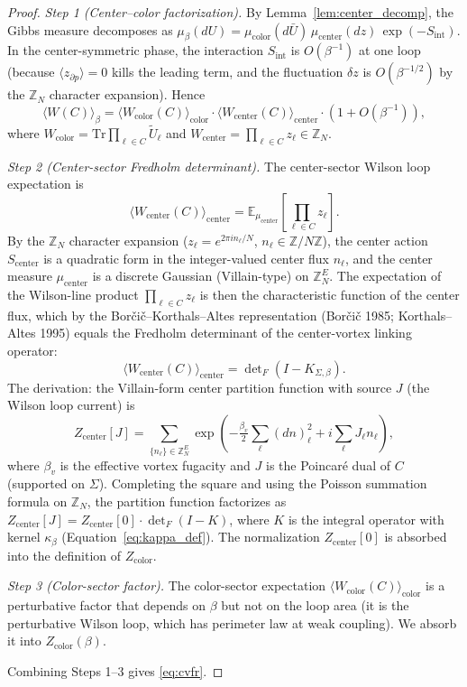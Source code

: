 \begin{proof}
\emph{Step 1 (Center--color factorization).} By
Lemma~\ref{lem:center_decomp}, the Gibbs measure decomposes as
$\mu_{\beta}(dU)=\mu_{\mathrm{color}}(d\bar{U})\,
\mu_{\mathrm{center}}(dz)\,
\exp(-S_{\mathrm{int}})$. In the center-symmetric phase, the
interaction $S_{\mathrm{int}}$ is $O(\beta^{-1})$ at one loop
(because $\langle z_{\partial p}\rangle=0$ kills the leading term,
and the fluctuation $\delta z$ is $O(\beta^{-1/2})$ by the
$\mathbb{Z}_{N}$ character expansion). Hence
\[
  \langle W(C)\rangle_{\beta}
  =\langle W_{\mathrm{color}}(C)\rangle_{\mathrm{color}}\cdot
   \langle W_{\mathrm{center}}(C)\rangle_{\mathrm{center}}\cdot
   (1+O(\beta^{-1})),
\]
where $W_{\mathrm{color}}=\mathrm{Tr}\prod_{\ell\in C}\tilde{U}_{\ell}$
and
$W_{\mathrm{center}}=\prod_{\ell\in C}z_{\ell}\in\mathbb{Z}_{N}$.

\emph{Step 2 (Center-sector Fredholm determinant).} The
center-sector Wilson loop expectation is
\[
  \langle W_{\mathrm{center}}(C)\rangle_{\mathrm{center}}
  =\mathbb{E}_{\mu_{\mathrm{center}}}\!\left[
    \prod_{\ell\in C}z_{\ell}\right].
\]
By the $\mathbb{Z}_{N}$ character expansion
($z_{\ell}=e^{2\pi i n_{\ell}/N}$, $n_{\ell}\in\mathbb{Z}/N\mathbb{Z}$),
the center action $S_{\mathrm{center}}$ is a quadratic form in the
integer-valued center flux $n_{\ell}$, and the center measure
$\mu_{\mathrm{center}}$ is a discrete Gaussian (Villain-type) on
$\mathbb{Z}_{N}^{E}$. The expectation of the Wilson-line product
$\prod_{\ell\in C}z_{\ell}$ is then the characteristic function of
the center flux, which by the Bor\v{c}i\v{c}--Korthals--Altes
representation (Bor\v{c}i\v{c} 1985; Korthals--Altes 1995) equals
the Fredholm determinant of the center-vortex linking operator:
\[
  \langle W_{\mathrm{center}}(C)\rangle_{\mathrm{center}}
  =\det\nolimits_{F}(I-K_{\Sigma,\beta}).
\]
The derivation: the Villain-form center partition function with
source $J$ (the Wilson loop current) is
\[
  Z_{\mathrm{center}}[J]
  =\sum_{\{n_{\ell}\}\in\mathbb{Z}_{N}^{E}}
    \exp\!\left(-\tfrac{\beta_{v}}{2}\sum_{\ell}
    (dn)_{\ell}^{2}+i\sum_{\ell}J_{\ell}n_{\ell}\right),
\]
where $\beta_{v}$ is the effective vortex fugacity and $J$ is the
Poincar\'{e} dual of $C$ (supported on $\Sigma$). Completing the
square and using the Poisson summation formula on
$\mathbb{Z}_{N}$, the partition function factorizes as
$Z_{\mathrm{center}}[J]=Z_{\mathrm{center}}[0]\cdot\det_{F}(I-K)$,
where $K$ is the integral operator with kernel
$\kappa_{\beta}$ (Equation~\eqref{eq:kappa_def}). The normalization
$Z_{\mathrm{center}}[0]$ is absorbed into the definition of
$Z_{\mathrm{color}}$.

\emph{Step 3 (Color-sector factor).} The color-sector expectation
$\langle W_{\mathrm{color}}(C)\rangle_{\mathrm{color}}$ is a
perturbative factor that depends on $\beta$ but not on the loop
area (it is the perturbative Wilson loop, which has perimeter law
at weak coupling). We absorb it into $Z_{\mathrm{color}}(\beta)$.

Combining Steps 1--3 gives \eqref{eq:cvfr}.
\end{proof}

